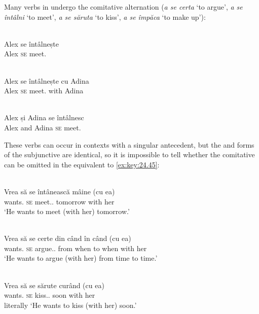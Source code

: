 \documentclass[output=paper]{langsci/langscibook}
\begin{document}
Many verbs in  undergo the comitative alternation (\emph{a se certa}
‘to argue’, \emph{a se întâlni} ‘to meet’, \emph{a se săruta} ‘to kiss’,
\emph{a se împăca} ‘to make up’):

\ea%
    \label{ex:key:24.42}\\
	\gll \llap{*}Alex     se   întâlnește\\
		Alex     \textsc{se}   meet.\Tsg{}\\
\z

\ea%
    \label{ex:key:24.43}\\
	\gll Alex     se   întâlnește   cu   Adina\\
		Alex     \textsc{se}   meet.\Tsg{}  with  Adina\\
\z

\ea%
    \label{ex:key:24.44}\\
	\gll Alex și Adina   se   întâlnesc\\
		Alex and Adina   \textsc{se}   meet.\Tpl{}\\
\z

These verbs can occur in  contexts with a singular antecedent, but the
\Tsg{} and \Tpl{} forms of the subjunctive are identical, so it is impossible
to tell whether the comitative can be omitted in the equivalent to \eqref{ex:key:24.45}:

\ea%
    \label{ex:key:24.45}\\
	\gll Vrea    să   se   întânească    mâine     (cu   ea)\\
    wants.\Tsg{} \Sbjv{}   \textsc{se}   meet.\Sbjv{}.\Third{}   tomorrow \hphantom{(}with   her\\
	\glt ‘He wants to meet (with her) tomorrow.’
\z

\ea%
    \label{ex:key:24.46}\\
	\gll Vrea     să   se   certe     din   când   în   când   (cu   ea)\\
    wants.\Tsg{} \Sbjv{}   \textsc{se}   argue.\Sbjv{}.\Third{}   from   when to   when  \hphantom{(}with   her\\
	\glt ‘He wants to argue (with her) from time to time.’
\z

\ea%
    \label{ex:key:24.47}\\
	\gll Vrea    să   se   sărute       curând     (cu   ea)\\
    wants.\Tsg{} \Sbjv{}   \textsc{se}   kiss.\Sbjv{}.\Third{}      soon \hphantom{(}with   her\\
	\glt literally ‘He wants to kiss (with her) soon.’
\z\newpage
\end{document}

